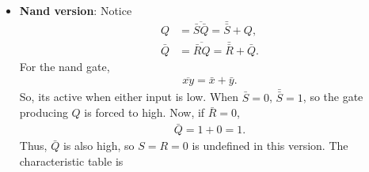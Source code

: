 \documentclass{report}
\begin{document}
\begin{itemize}
\begin{center}
\begin{tabularx}{\textwidth}{@{}XXX@{}}
                    \bottomrule
                \end{tabularx}
            \end{center}
            \bigbreak \noindent 
            \textbf{Note:} This version corresponds to \textbf{active-high}, cross-coupled NOR SR latch.
            \bigbreak \noindent 
            Notice that the NOR is active whenever
            \begin{align*}
                \overline{x+y} = \bar{x}\bar{y} = 1
            .\end{align*}
            So, both inputs are off. Suppose $S = R = 0$, and $Q = 1$. Then,
            \begin{align*}
                SQ &= 01 = 0 \implies \bar{Q} = 0, \\
                R\bar{Q} &= 00 = 1 \implies Q = 1
            .\end{align*}
            Thus, we have the self-maintaining loop. When $S=1$, it forces $\bar{Q} = 0$. This means the \(Q\)-producing gate now has both inputs low, assuming \(R=0\), so $Q = 1$.
            \bigbreak \noindent 
            When $R=1$, $Q = 0$, so $SQ = 00 = 1 = \bar{Q}$.
        \item \textbf{Nand version}: 
            \bigbreak \noindent 
            \bigbreak \noindent 
            Notice
            \begin{align*}
                Q &= \overline{\bar{S}\bar{Q}} = \bar{\bar{S}} + Q, \\
                \bar{Q} &= \overline{\bar{R}Q} = \bar{\bar{R}} + \bar{Q}
            .\end{align*}
            For the nand gate,
            \begin{align*}
                \overline{xy} = \bar{x} + \bar{y}
            .\end{align*}
            So, its active when either input is low. When $\bar{S} = 0$, $\bar{\bar{S}} = 1$, so the gate producing $Q$ is forced to high. Now, if $\bar{R} = 0$, 
            \begin{align*}
                \bar{Q} = 1 + 0 = 1
            .\end{align*}
            Thus, $\bar{Q}$ is also high, so $S = R = 0$ is undefined in this version.
            \bigbreak \noindent 
            The characteristic table is
            \begin{center}
                \begin{tabularx}{\textwidth}{@{}XXXX@{}}
                    \toprule

\end{tabularx}
\end{center}
\end{itemize}
\end{document}
